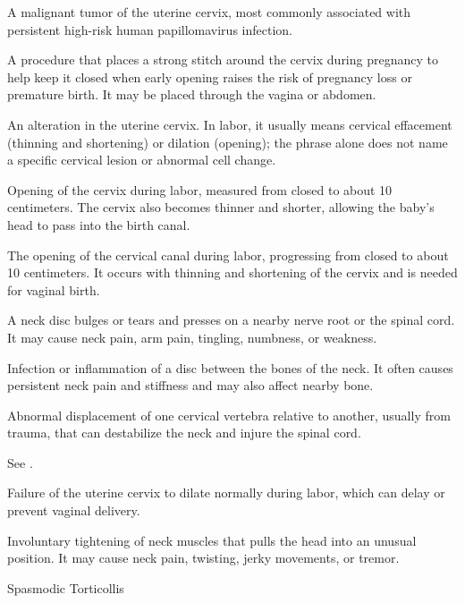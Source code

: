  A malignant tumor of the uterine cervix, most commonly associated with persistent
high-risk human papillomavirus infection.

 A procedure that places a strong stitch around the cervix during pregnancy to help keep it closed when early opening raises the risk of pregnancy loss or premature birth. It may be placed through the vagina or abdomen.

 An alteration in the uterine cervix. In labor, it usually means cervical effacement (thinning and shortening) or dilation (opening); the phrase alone does not name a specific cervical lesion or abnormal cell change.

 Opening of the cervix during labor, measured from closed to about 10 centimeters. The cervix also becomes thinner and shorter, allowing the baby's head to pass into the birth canal.

 The opening of the cervical canal during labor, progressing from closed to about 10 centimeters. It occurs with thinning and shortening of the cervix and is needed for vaginal birth.

 A neck disc bulges or tears and presses on a nearby nerve root or the spinal cord. It may cause neck pain, arm pain, tingling, numbness, or weakness.

 Infection or inflammation of a disc between the bones of the neck. It often causes persistent neck pain and stiffness and may also affect nearby bone.

 Abnormal displacement of one cervical vertebra relative to another, usually from trauma, that can destabilize the neck and injure the spinal cord.

 See .

 Failure of the uterine cervix to dilate normally during labor, which can delay or prevent vaginal delivery.

 Involuntary tightening of neck muscles that
pulls the head into an unusual position. It may cause neck pain, twisting,
jerky movements, or tremor.

\synonyms
Spasmodic Torticollis

